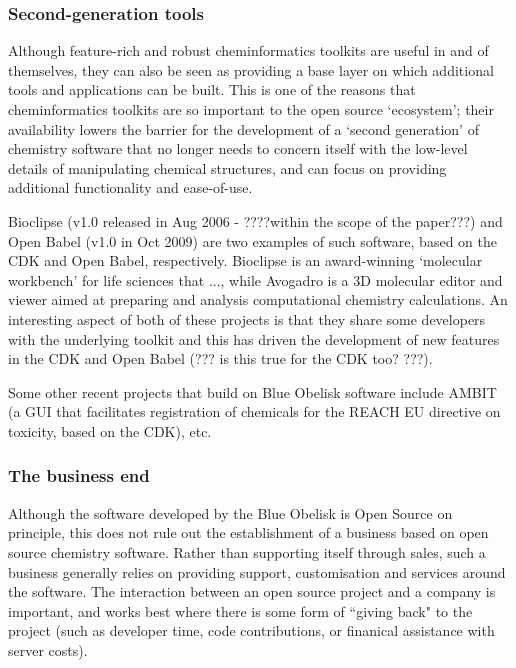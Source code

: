 \documentclass[10pt]{bmc_article}
\newenvironment{bmcformat}{\begin{raggedright}\baselineskip20pt\sloppy\setboolean{publ}{false}}{\end{raggedright}\baselineskip20pt\sloppy}
\begin{document}
\begin{bmcformat}
\subsubsection*{Second-generation tools}

Although feature-rich and robust cheminformatics toolkits are useful
in and of themselves, they can also be seen as providing a base layer
on which additional tools and applications can be built. This is one of the reasons that cheminformatics toolkits are so important to the open source `ecosystem'; their availability lowers the barrier for the development of a `second generation' of chemistry software that no longer needs to concern itself with the low-level details of manipulating chemical structures, and can focus on providing additional functionality and ease-of-use.

Bioclipse (v1.0 released in Aug 2006 - ????within the scope of the paper???) and Open Babel (v1.0 in Oct 2009) are two examples of such software, based on the CDK and Open Babel, respectively. Bioclipse is an award-winning `molecular workbench' for life sciences that ..., while Avogadro is a 3D molecular editor and viewer aimed at preparing and analysis computational chemistry calculations. An interesting aspect of both of these projects is that they share some developers with the underlying toolkit and this has driven the development of new features in the CDK and Open Babel (??? is this true for the CDK too? ???).

Some other recent projects that build on Blue Obelisk software include AMBIT (a GUI that facilitates registration of chemicals for the REACH EU directive on toxicity, based on the CDK), etc.

\subsubsection*{The business end}

Although the software developed by the Blue Obelisk is Open Source on principle, this does not rule out the establishment of a business based on open source chemistry software. Rather than supporting itself through sales, such a business generally relies on providing support, customisation and services around the software. The interaction between an open source project and a company is important, and works best where there is some form of ``giving back" to the project (such as developer time, code contributions, or finanical assistance with server costs).


\end{bmcformat}
\end{document}
